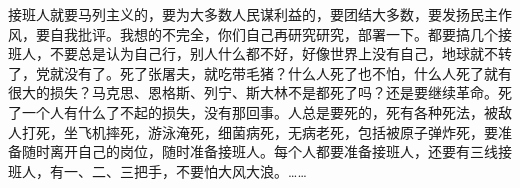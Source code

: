 接班人就要马列主义的，要为大多数人民谋利益的，要团结大多数，要发扬民主作风，要自我批评。我想的不完全，你们自己再研究研究，部署一下。都要搞几个接班人，不要总是认为自己行，别人什么都不好，好像世界上没有自己，地球就不转了，党就没有了。死了张屠夫，就吃带毛猪？什么人死了也不怕，什么人死了就有很大的损失？马克思、恩格斯、列宁、斯大林不是都死了吗？还是要继续革命。死了一个人有什么了不起的损失，没有那回事。人总是要死的，死有各种死法，被敌人打死，坐飞机摔死，游泳淹死，细菌病死，无病老死，包括被原子弹炸死，要准备随时离开自己的岗位，随时准备接班人。每个人都要准备接班人，还要有三线接班人，有一、二、三把手，不要怕大风大浪。……


